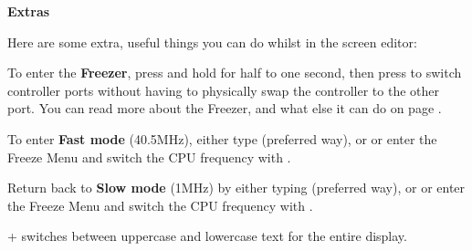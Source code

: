 \textbf{Extras}

Here are some extra, useful things you can do whilst in the screen editor:

To enter the \textbf{Freezer}, press and hold  for half to one second, then press  to
switch controller ports without having to physically swap the controller to the other port. You can read more about
the Freezer, and what else it can do on page \pageref{sec:freezer}.

  To enter \textbf{Fast mode} (40.5MHz), either type  (preferred way), or  or enter the Freeze Menu and switch the CPU frequency with .

  Return back to \textbf{Slow mode} (1MHz) by either typing  (preferred way), or  or enter the Freeze Menu and switch the CPU frequency with .

  \megasymbolkey +  switches between uppercase and lowercase text for the entire display.
